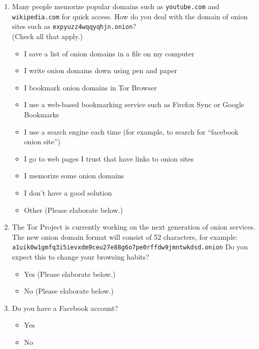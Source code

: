 \begin{enumerate}
    \item Many people memorize popular domains such as \texttt{youtube.com} and
        \texttt{wikipedia.com} for quick access. How do you deal with the domain
        of onion sites such as \texttt{expyuzz4wqqyqhjn.onion}?\\(Check all that
        apply.)
        \label{q3_7}
        \begin{itemize}[label=$\Square$]
            \item I save a list of onion domains in a file on my computer
            \item I write onion domains down using pen and paper
            \item I bookmark onion domains in Tor Browser
            \item I use a web-based bookmarking service such as Firefox Sync or
                Google Bookmarks
            \item I use a search engine each time (for example, to search for
                ``facebook onion site'')
            \item I go to web pages I trust that have links to onion sites
            \item I memorize some onion domains
            \item I don't have a good solution
            \item Other (Please elaborate below.)
        \end{itemize}

    \item The Tor Project is currently working on the next generation of onion
        services. The new onion domain format will consist of 52 characters,
        for example:
        \texttt{a1uik0w1gmfq3i5ievxdm9ceu27e88g6o7pe0rffdw9jmn\-twkdsd.onion}
        Do you expect this to change your browsing habits?
        \begin{itemize}[label=$\Circle$]
            \item Yes (Please elaborate below.)
            \item No (Please elaborate below.)
        \end{itemize}

    \item Do you have a Facebook account?
        \begin{itemize}[label=$\Circle$]
            \item Yes
            \item No
        \end{itemize}


\end{enumerate}
